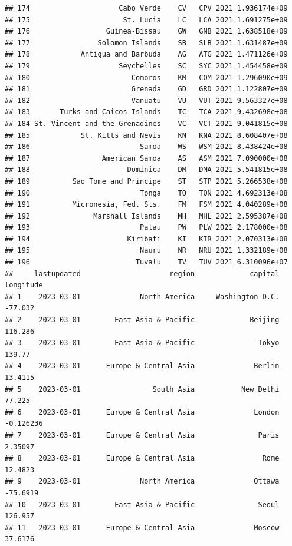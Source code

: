 \documentclass[
]{article}
\begin{document}
\begin{verbatim}
## 174                     Cabo Verde    CV   CPV 2021 1.936174e+09       
## 175                      St. Lucia    LC   LCA 2021 1.691275e+09       
## 176                  Guinea-Bissau    GW   GNB 2021 1.638518e+09       
## 177                Solomon Islands    SB   SLB 2021 1.631487e+09       
## 178            Antigua and Barbuda    AG   ATG 2021 1.471126e+09       
## 179                     Seychelles    SC   SYC 2021 1.454458e+09       
## 180                        Comoros    KM   COM 2021 1.296090e+09       
## 181                        Grenada    GD   GRD 2021 1.122807e+09       
## 182                        Vanuatu    VU   VUT 2021 9.563327e+08       
## 183       Turks and Caicos Islands    TC   TCA 2021 9.432698e+08       
## 184 St. Vincent and the Grenadines    VC   VCT 2021 9.041815e+08       
## 185            St. Kitts and Nevis    KN   KNA 2021 8.608407e+08       
## 186                          Samoa    WS   WSM 2021 8.438424e+08       
## 187                 American Samoa    AS   ASM 2021 7.090000e+08       
## 188                       Dominica    DM   DMA 2021 5.541815e+08       
## 189          Sao Tome and Principe    ST   STP 2021 5.266538e+08       
## 190                          Tonga    TO   TON 2021 4.692313e+08       
## 191          Micronesia, Fed. Sts.    FM   FSM 2021 4.040289e+08       
## 192               Marshall Islands    MH   MHL 2021 2.595387e+08       
## 193                          Palau    PW   PLW 2021 2.178000e+08       
## 194                       Kiribati    KI   KIR 2021 2.070313e+08       
## 195                          Nauru    NR   NRU 2021 1.332189e+08       
## 196                         Tuvalu    TV   TUV 2021 6.310096e+07       
##     lastupdated                     region             capital  longitude
## 1    2023-03-01              North America     Washington D.C.    -77.032
## 2    2023-03-01        East Asia & Pacific             Beijing    116.286
## 3    2023-03-01        East Asia & Pacific               Tokyo     139.77
## 4    2023-03-01      Europe & Central Asia              Berlin    13.4115
## 5    2023-03-01                 South Asia           New Delhi     77.225
## 6    2023-03-01      Europe & Central Asia              London  -0.126236
## 7    2023-03-01      Europe & Central Asia               Paris    2.35097
## 8    2023-03-01      Europe & Central Asia                Rome    12.4823
## 9    2023-03-01              North America              Ottawa   -75.6919
## 10   2023-03-01        East Asia & Pacific               Seoul    126.957
## 11   2023-03-01      Europe & Central Asia              Moscow    37.6176

\end{verbatim}
\end{document}
